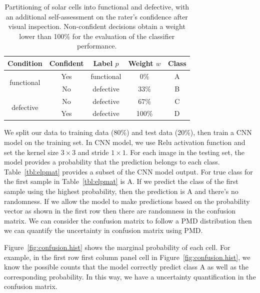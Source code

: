 \documentclass[12pt]{article}
\begin{document}
\begin{table}%
\caption{Partitioning of solar cells into functional and defective, with an additional self-assessment on the rater's confidence after visual inspection. Non-confident decisions obtain a weight lower than 100\% for the evaluation of the classifier performance.}\label{tbl:el.label}
\begin{center}	
\begin{tabular}{c|c|c|c|c}
		\hline
		\hline
		Condition  & Confident  &  Label $p$ & Weight $w$ & Class \\
		\hline
		\multirow{2}{*}{functional} & Yes & functional & 0\% & A\\
		& No& defective  & 33\% & B\\
		\hline
		\multirow{2}{*}{defective} & No & defective & 67\% & C\\
		& Yes & defective & 100\%  &D\\
		\hline
		\hline
	\end{tabular}
\end{center}
\end{table}

We split our data to training data (80\%) and test data (20\%), then train a CNN \cite{DBLP:journals/corr/LongSD14} model on the training set. In CNN model, we use Relu activation function and set the kernel size $3 \times 3$ and stride $1 \times 1$. For each image in the testing set, the model provides a probability that the prediction belongs to each class. Table~\ref{tbl:elpmat} provides a subset of the CNN model output. For true class for the first sample in Table~\ref{tbl:elpmat} is A. If we predict the class of the first sample using the highest probability, then the prediction is A and there's no randomness. If we allow the model to make predictions based on the probability vector as shown in the first row then there are randomness in the confusion matrix. We can consider the confusion matrix to follow a PMD distribution then we can quantify the uncertainty in confusion matrix using PMD.

Figure~\ref{fig:confusion.hist} shows the marginal probability of each cell. For example, in the first row first column panel cell in Figure~\ref{fig:confusion.hist}, we know the possible counts that the model correctly predict class A as well as the corresponding probability. In this way, we have a uncertainty quantification in the confusion matrix.
\end{document}
